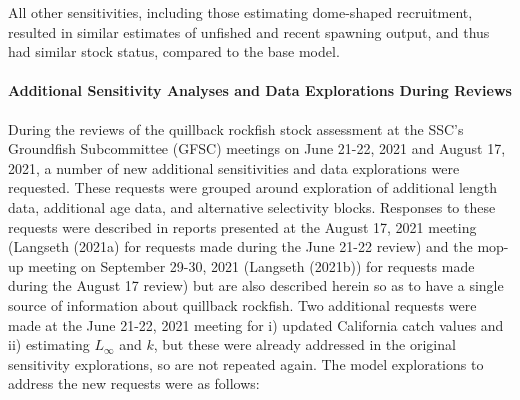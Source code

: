 \documentclass[11pt,
  english,
  a4paper,
]{article}
\begin{document}
\leavevmode\tagmcend\tagstructend\par


All other sensitivities, including those estimating dome-shaped recruitment, resulted in similar estimates of unfished and recent spawning output, and thus had similar stock status, compared to the base model.

\leavevmode\tagmcend\tagstructend\par


\hypertarget{additional-sensitivity-analyses-and-data-explorations-during-reviews}{%
\paragraph{Additional Sensitivity Analyses and Data Explorations During Reviews}\label{additional-sensitivity-analyses-and-data-explorations-during-reviews}}

\leavevmode\tagmcend\tagstructend


During the reviews of the quillback rockfish stock assessment at the SSC's Groundfish Subcommittee (GFSC) meetings on June 21-22, 2021 and August 17, 2021, a number of new additional sensitivities and data explorations were requested. These requests were grouped around exploration of additional length data, additional age data, and alternative selectivity blocks. Responses to these requests were described in reports presented at the August 17, 2021 meeting (Langseth {(2021a)\leavevmode\tagmcend\tagstructend} for requests made during the June 21-22 review) and the mop-up meeting on September 29-30, 2021 (Langseth {(2021b)\leavevmode\tagmcend\tagstructend}) for requests made during the August 17 review) but are also described herein so as to have a single source of information about quillback rockfish. Two additional requests were made at the June 21-22, 2021 meeting for i) updated California catch values and ii) estimating {\(L_{\infty}\)\leavevmode\tagmcend\tagstructend} and {\(k\)\leavevmode\tagmcend\tagstructend}, but these were already addressed in the original sensitivity explorations, so are not repeated again. The model explorations to address the new requests were as follows:
\end{document}

